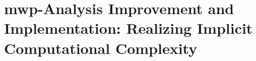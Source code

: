 \appendix

\chapter{mwp-Analysis Improvement and Implementation: Realizing Implicit Computational Complexity}\label{app:sec:fscd}


